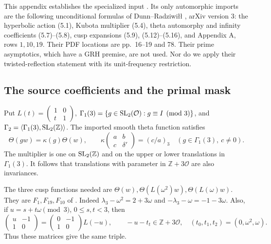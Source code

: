 \documentclass[12pt]{article}
\begin{document}
This appendix establishes the specialized input
\cite[Proposition 5.1 and Corollary 14.1]{QRH}.  Its only
automorphic imports are the following unconditional formulas of
Dunn--Radziwi{\l}{\l} \cite{DR}, arXiv version 3:
the hyperbolic action (5.1), Kubota multiplier (5.4), theta
automorphy and infinity coefficients (5.7)--(5.8), cusp expansions
(5.9), (5.12)--(5.16), and Appendix A, rows \(1,10,19\).
Their PDF locations are pp.\ 16--19 and 78.  Their prime
asymptotics, which have a GRH premise, are not used.  Nor do we
apply their twisted-reflection statement with its unit-frequency
restriction.

\subsection{The source coefficients and the primal mask}

Put \(L(t)=\left(\begin{smallmatrix}1&0\\t&1\end{smallmatrix}\right)\),
\(\Gamma_1(3)=\{g\in{\rm SL}_2(\mathcal O):g\equiv I\pmod3\}\),
and \(\Gamma_2=\langle\Gamma_1(3),{\rm SL}_2(\mathbb Z)\rangle\).
The imported smooth theta function satisfies
\[
 \Theta(gw)=\kappa(g)\Theta(w),\qquad
 \kappa\begin{pmatrix}a&b\\c&\delta'\end{pmatrix}
                  =(c/a)_3\quad(g\in\Gamma_1(3),\ c\ne0).
\]
The multiplier is one on \({\rm SL}_2(\mathbb Z)\) and on the
upper or lower translations in \(\Gamma_1(3)\).
It follows that translations with parameter in
\(\mathbb Z+3\mathcal O\) are also invariances.

The three cusp functions needed are
\(\Theta(w),\Theta(L(\omega^2)w),\Theta(L(\omega)w)\).
They are \(F_1,F_{19},F_{10}\) of \cite{DR}.
Indeed
\(\lambda_3-\omega^2=2+3\omega\) and
\(-\lambda_3-\omega=-1-3\omega\).
Also, if \(u=s+t\omega\pmod3\), \(0\le s,t<3\), then
\[
 \begin{pmatrix}u&-1\\1&0\end{pmatrix}
       =\begin{pmatrix}0&-1\\1&0\end{pmatrix}L(-u),\qquad
 -u-t_t\in\mathbb Z+3\mathcal O,\quad
 (t_0,t_1,t_2)=(0,\omega^2,\omega).
\]
Thus these matrices give the same triple.
\end{document}
